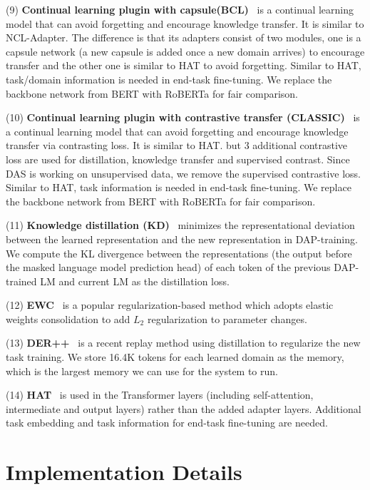 \documentclass{article} \usepackage{iclr2023_conference,times}
\begin{document}
(9) \textbf{Continual learning plugin with capsule(BCL)}~\cite{ke2021adapting} is a continual learning model that can avoid forgetting and encourage knowledge transfer. It is similar to NCL-Adapter. The difference is that its adapters consist of two modules, one is a capsule network (a new capsule is added once a new domain arrives) to encourage transfer and the other one is similar to HAT to avoid forgetting. Similar to HAT, task/domain information is needed in end-task fine-tuning. We replace the backbone network from BERT with RoBERTa for fair comparison. 

(10) \textbf{Continual learning plugin with contrastive transfer (CLASSIC)}~\cite{ke2021Classic} is a continual learning model that can avoid forgetting and encourage knowledge transfer via contrasting loss. It is similar to HAT. but 3 additional contrastive loss are used for distillation, knowledge transfer and supervised contrast. Since DAS is working on unsupervised data, we remove the supervised contrastive loss. Similar to HAT, task information is needed in end-task fine-tuning. We replace the backbone network from BERT with RoBERTa for fair comparison. 

(11) \textbf{Knowledge distillation (KD)}~\cite{hinton2015distilling}
minimizes the representational deviation between the learned representation and the new representation in DAP-training. We
compute the KL divergence between the representations (the output before the masked language model prediction head) of each token of the previous DAP-trained LM and current LM as the distillation loss.

(12) \textbf{EWC}~\cite{buzzega2020dark} is a popular
regularization-based method which adopts elastic weights consolidation to add $L_2$ regularization to parameter changes.

(13) \textbf{DER++}~\cite{buzzega2020dark} is a recent replay method using distillation to regularize the new task training. We store 16.4K tokens for each learned domain as the memory, which is the largest memory we can use for the system to run.

(14) \textbf{HAT}~\cite{Serra2018overcoming} is used in the Transformer layers (including self-attention, intermediate and output layers) rather than the added adapter layers. Additional task embedding and task information for end-task fine-tuning are needed.







\section{Implementation Details}
\label{ap:imp_detail}
\end{document}
